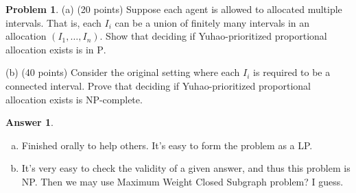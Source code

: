 \documentclass{article}
\theoremstyle{definition}
\newtheorem{prob}{Problem}
\newtheorem{ans}{Answer}
\begin{document}
\begin{prob}
		(a) (20 points) Suppose each agent is allowed to allocated multiple intervals. That is, each $I_{i}$ can be a union of finitely many intervals in an allocation $\left(I_{1}, \ldots, I_{n}\right)$. Show that deciding if Yuhao-prioritized proportional allocation exists is in $\mathrm{P}$.
		
		(b) (40 points) Consider the original setting where each $I_{i}$ is required to be a connected interval. Prove that deciding if Yuhao-prioritized proportional allocation exists is NP-complete. 
		
	\end{prob}

	\begin{ans}
		~
		
		\begin{enumerate}[(a)]
			\item Finished orally to help others. It's easy to form the problem as a LP.
			\item It's very easy to check the validity of a given answer, and thus this problem is NP. Then we may use Maximum Weight Closed Subgraph problem? I guess.
		\end{enumerate}
	\end{ans}
	
\end{document}
